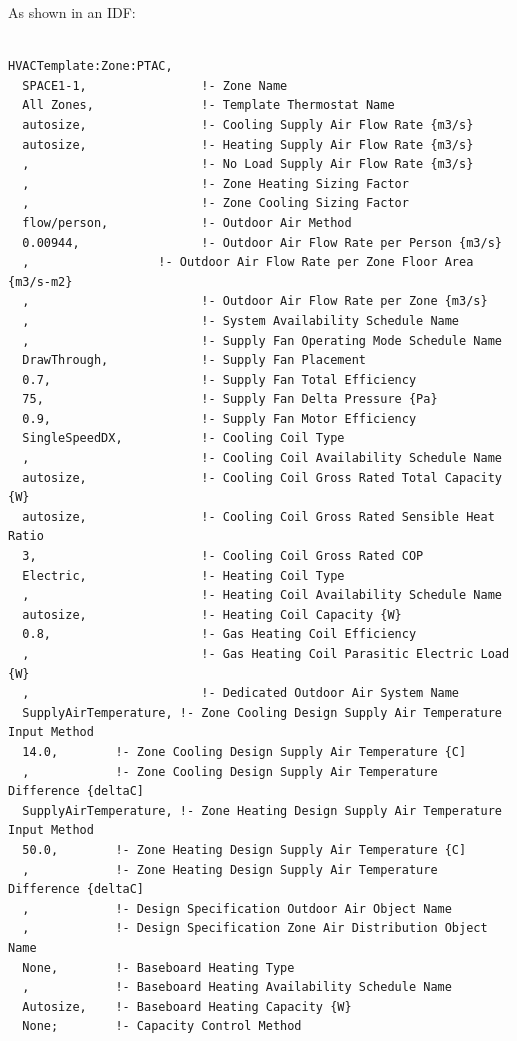 As shown in an IDF:

\begin{lstlisting}

HVACTemplate:Zone:PTAC,
  SPACE1-1,                !- Zone Name
  All Zones,               !- Template Thermostat Name
  autosize,                !- Cooling Supply Air Flow Rate {m3/s}
  autosize,                !- Heating Supply Air Flow Rate {m3/s}
  ,                        !- No Load Supply Air Flow Rate {m3/s}
  ,                        !- Zone Heating Sizing Factor
  ,                        !- Zone Cooling Sizing Factor
  flow/person,             !- Outdoor Air Method
  0.00944,                 !- Outdoor Air Flow Rate per Person {m3/s}
  ,                  !- Outdoor Air Flow Rate per Zone Floor Area {m3/s-m2}
  ,                        !- Outdoor Air Flow Rate per Zone {m3/s}
  ,                        !- System Availability Schedule Name
  ,                        !- Supply Fan Operating Mode Schedule Name
  DrawThrough,             !- Supply Fan Placement
  0.7,                     !- Supply Fan Total Efficiency
  75,                      !- Supply Fan Delta Pressure {Pa}
  0.9,                     !- Supply Fan Motor Efficiency
  SingleSpeedDX,           !- Cooling Coil Type
  ,                        !- Cooling Coil Availability Schedule Name
  autosize,                !- Cooling Coil Gross Rated Total Capacity {W}
  autosize,                !- Cooling Coil Gross Rated Sensible Heat Ratio
  3,                       !- Cooling Coil Gross Rated COP
  Electric,                !- Heating Coil Type
  ,                        !- Heating Coil Availability Schedule Name
  autosize,                !- Heating Coil Capacity {W}
  0.8,                     !- Gas Heating Coil Efficiency
  ,                        !- Gas Heating Coil Parasitic Electric Load {W}
  ,                        !- Dedicated Outdoor Air System Name
  SupplyAirTemperature, !- Zone Cooling Design Supply Air Temperature Input Method
  14.0,        !- Zone Cooling Design Supply Air Temperature {C]
  ,            !- Zone Cooling Design Supply Air Temperature Difference {deltaC]
  SupplyAirTemperature, !- Zone Heating Design Supply Air Temperature Input Method
  50.0,        !- Zone Heating Design Supply Air Temperature {C]
  ,            !- Zone Heating Design Supply Air Temperature Difference {deltaC]
  ,            !- Design Specification Outdoor Air Object Name
  ,            !- Design Specification Zone Air Distribution Object Name
  None,        !- Baseboard Heating Type
  ,            !- Baseboard Heating Availability Schedule Name
  Autosize,    !- Baseboard Heating Capacity {W}
  None;        !- Capacity Control Method
\end{lstlisting}

